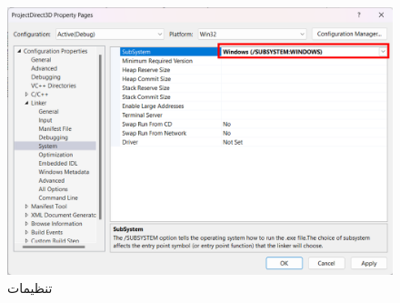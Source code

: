 {\begin{spacing}{1.5}
        \begin{figure}[H]
            \centering
            \setlength{\belowcaptionskip}{-10pt}
            \includegraphics[width=\textwidth]{Images/3/3.Intro.5.7}
            \caption{تنظیمات }
            \label{fig:3.Intro.5.7}
        \end{figure}
    \end{spacing}
}
\textbf{\vspace{12pt}}

\title{
    \Large
}
\textbf{\vspace{-10pt}}

